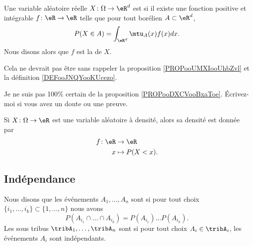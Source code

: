 \begin{definition}      \label{DEFooRNKZooRczFwB}
	Une variable aléatoire réelle \( X\colon \Omega\to \eR^d\) est  si il existe une fonction positive et intégrable \( f\colon \eR\to \eR\) telle que pour tout borélien \( A\subset \eR^d\),
	\begin{equation}
		P(X\in A)=\int_{\eR^d}\mtu_A(x)f(x)dx.
	\end{equation}
	Nous disons alors que \( f\) est la  de \( X\).
\end{definition}
Cela ne devrait pas être sans rappeler la proposition \ref{PROPooUMXIooUhbZvl} et la définition \ref{DEFooJNQYooKUcezo}.


\begin{probleme}		\label{PROBooSWDQooHlSZPD}
	Je ne suis pas 100\% certain de la proposition \ref{PROPooDXCVooBxaToe}. Écrivez-moi si vous avez un doute ou une preuve.
\end{probleme}

\begin{proposition}	\label{PROPooDXCVooBxaToe}
	Si \(X \colon \Omega\to \eR  \) est une variable aléatoire à densité, alors sa densité est donnée par
	\begin{equation}
		\begin{aligned}
			f\colon \eR & \to \eR         \\
			x           & \mapsto P(X<x).
		\end{aligned}
	\end{equation}
\end{proposition}

\subsection{Indépendance}

\begin{definition}      \label{DEFooVYCUooKWvReO}
	Nous disons que les événements \( A_1,\ldots,A_n\) sont  si pour tout choix \( \{ i_1,\ldots,i_k \}\subset\{ 1,\ldots,n \}\) nous avons
	\begin{equation}
		P(A_{i_1}\cap\ldots\cap A_{i_k})=P(A_{i_1})\ldots P(A_{i_k}).
	\end{equation}
	Les sous tribus \( \tribA_1,\ldots,\tribA_n\) sont  si pour tout choix \( A_i\in \tribA_i\), les événements \( A_i\) sont indépendants.
\end{definition}

